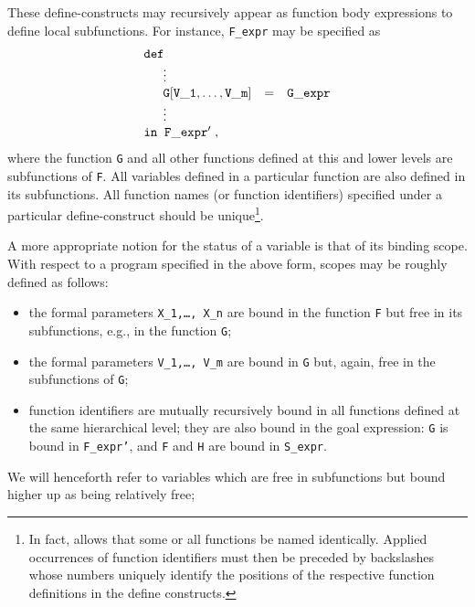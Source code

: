 These {\sc define}-{\mys constructs}
may recursively appear as function body
expressions to define local subfunctions.
For instance, {\tt F\_expr} may be specified as
$$
\begin{array}{lcl}
{\tt def} \\
\phantom{{\sc in}\;\;}\vdots \\
\phantom{{\sc in}\;\;}{\tt G[V\_1, \ldots, V\_m]}&=&{\tt G\_expr} \\
\phantom{{\sc in}\;\;}\vdots \\
{\tt in}\;\; {\tt F\_expr'}\;,
\end{array}
$$
where the function {\tt G} and all other functions defined at this
and lower
levels are {\mys subfunctions}
of {\tt F}. All variables defined in a
particular function are also defined in its subfunctions.
All {\mys function names} (or {\mys function identifiers}) specified under a particular {\sc define}-construct
should be unique\footnote{ In fact, \pired allows that some or all functions be named 
identically. Applied occurrences of function identifiers must then be 
preceded
by backslashes whose numbers uniquely identify the positions of the respective
function definitions in the {\sc define} constructs.}.

\arraycolsep 5pt
A more appropriate notion for the status of a variable is
that of its {\mys binding scope}.
With respect to a program specified in the above form, scopes may
be roughly defined as follows:
\begin{itemize}
\item the
formal parameters {\tt X\_1,\ldots, X\_n} are {\mys bound}
in the function {\tt F} but {\mys free}
in its subfunctions, e.g., in the function {\tt G};
\item the formal parameters {\tt V\_1,\ldots, V\_m} are bound in
{\tt G} but, again, free in the subfunctions of {\tt G};
\item function identifiers are mutually recursively bound in all
functions defined at the same hierarchical level; they are
also bound in the goal expression: {\tt G} is bound in
{\tt F\_expr'}, and {\tt F} and {\tt H} are bound in {\tt S\_expr}.
\end{itemize}
We will henceforth refer to
variables which are free in subfunctions but bound higher up
as being {\mys relatively free};

